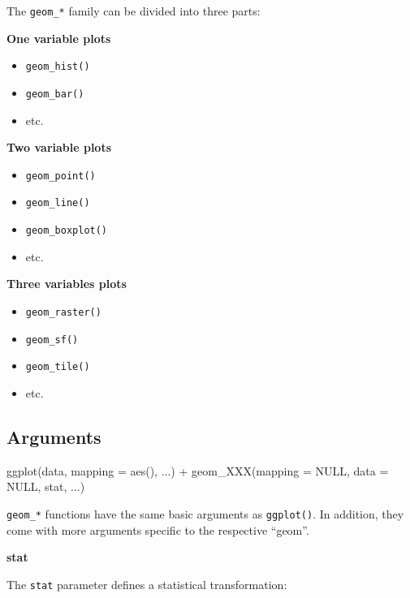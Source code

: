 \documentclass[]{book}
\newenvironment{Shaded}{}{}
\newcommand{\DataTypeTok}[1]{#1}
\newcommand{\KeywordTok}[1]{\textcolor[rgb]{0.00,0.00,1.00}{#1}}
\newcommand{\NormalTok}[1]{#1}
\newcommand{\OperatorTok}[1]{#1}
\newcommand{\OtherTok}[1]{\textcolor[rgb]{1.00,0.25,0.00}{#1}}
\newcommand{\StringTok}[1]{\textcolor[rgb]{0.00,0.50,0.50}{#1}}
\providecommand{\tightlist}{%
  \setlength{\itemsep}{0pt}\setlength{\parskip}{0pt}}
\begin{document}
The \texttt{geom\_*} family can be divided into three parts:

\textbf{One variable plots}

\begin{itemize}
\tightlist
\item
  \texttt{geom\_hist()}
\item
  \texttt{geom\_bar()}
\item
  etc.
\end{itemize}

\textbf{Two variable plots}

\begin{itemize}
\tightlist
\item
  \texttt{geom\_point()}
\item
  \texttt{geom\_line()}
\item
  \texttt{geom\_boxplot()}
\item
  etc.
\end{itemize}

\textbf{Three variables plots}

\begin{itemize}
\tightlist
\item
  \texttt{geom\_raster()}
\item
  \texttt{geom\_sf()}
\item
  \texttt{geom\_tile()}
\item
  etc.
\end{itemize}

\hypertarget{arguments}{%
\subsection{Arguments}\label{arguments}}

\begin{Shaded}
\begin{Highlighting}[]
\KeywordTok{ggplot}\NormalTok{(data, }\DataTypeTok{mapping =} \KeywordTok{aes}\NormalTok{(), ...) }\OperatorTok{+}
\StringTok{  }\KeywordTok{geom_XXX}\NormalTok{(}\DataTypeTok{mapping =} \OtherTok{NULL}\NormalTok{, }\DataTypeTok{data =} \OtherTok{NULL}\NormalTok{, stat, ...)}
\end{Highlighting}
\end{Shaded}

\texttt{geom\_*} functions have the same basic arguments as \texttt{ggplot()}.
In addition, they come with more arguments specific to the respective ``geom''.

\textbf{stat}

The \texttt{stat} parameter defines a statistical transformation:
\end{document}
